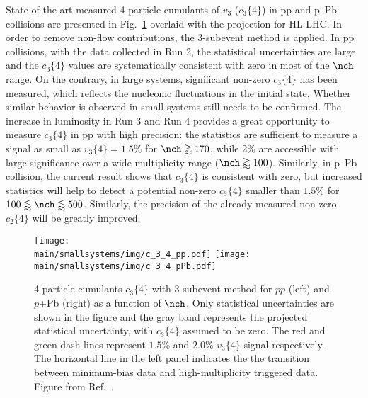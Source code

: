 \documentclass[../report.tex]{subfiles}
\providecommand{\main}{..}
\begin{document}
State-of-the-art measured 4-particle cumulants of $v_3$ ($c_3\{4\}$) in pp and p--Pb collisions are presented in Fig.~\ref{fig:smallsystems_corr_cumulants} overlaid with the projection for HL-LHC. 
In order to remove non-flow contributions, the 3-subevent method is applied. In pp collisions, with the data collected in Run 2, the statistical uncertainties are large and the $c_3\{4\}$ values are systematically consistent with zero in most of the $\nch$ range. On the contrary, in large systems, significant non-zero $c_3\{4\}$ has been measured, which reflects the nucleonic fluctuations in the initial state. Whether similar behavior is observed in small systems still needs to be confirmed. The increase in luminosity in Run 3 and Run 4 provides a great opportunity to measure $c_3\{4\}$ in pp with high precision: the statistics are sufficient to measure a signal as small as $v_3\{4\} = 1.5\%$ for $\nch \gtrapprox 170$, while 2\% are accessible with large significance over a wide multiplicity range ($\nch \gtrapprox 100$). Similarly, in p--Pb collision, the current result shows that $c_3\{4\}$ is consistent with zero, but increased statistics will help to detect a potential non-zero $c_3\{4\}$ smaller than $1.5\%$ for $100 \lessapprox \nch \lessapprox 500$. Similarly, the precision of the already measured non-zero $c_2\{4\}$ will be greatly improved.

\begin{figure}[ht]
\centering
\texttt{[image: \\main/smallsystems/img/c\_3\_4\_pp.pdf]}
\texttt{[image: \\main/smallsystems/img/c\_3\_4\_pPb.pdf]}
\caption{4-particle cumulants $c_3\{4\}$ with 3-subevent method for $pp$ (left) and $p$+Pb (right) as a function of $\nch$. Only statistical uncertainties are shown in the figure and the gray band represents the projected statistical uncertainty, with $c_3\{4\}$ assumed to be zero. The red and green dash lines represent $1.5\%$ and $2.0\%$ $v_3\{4\}$ signal respectively. The horizontal line in the left panel indicates the the transition between minimum-bias data and high-multiplicity triggered data. Figure from Ref.~\cite{}.}
\label{fig:smallsystems_corr_cumulants}
\end{figure}
\end{document}
